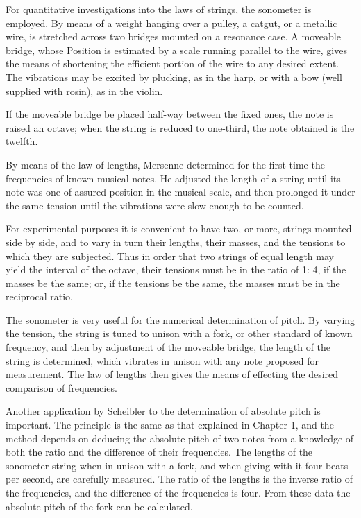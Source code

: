 For quantitative investigations into the laws of strings, the sonometer is
employed. By means of a weight hanging over a pulley, a catgut, or a metallic
wire, is stretched across two bridges mounted on a resonance case. A moveable
bridge, whose Position is estimated by a scale running parallel to the wire,
gives the means of shortening the efficient portion of the wire to any desired
extent. The vibrations may be excited by plucking, as in the harp, or with a
bow (well supplied with rosin), as in the violin.

If the moveable bridge be placed half-way between the fixed ones, the note is
raised an octave; when the string is reduced to one-third, the note obtained is
the twelfth.

By means of the law of lengths, Mersenne determined for the first time the
frequencies of known musical notes. He adjusted the length of a string until
its note was one of assured position in the musical scale, and then prolonged
it under the same tension until the vibrations were slow enough to be counted.

For experimental purposes it is convenient to have two, or more, strings
mounted side by side, and to vary in turn their lengths, their masses, and the
tensions to which they are subjected. Thus in order that two strings of equal
length may yield the interval of the octave, their tensions must be in the
ratio of 1: 4, if the masses be the same; or, if the tensions be the same, the
masses must be in the reciprocal ratio.

The sonometer is very useful for the numerical determination of pitch.  By
varying the tension, the string is tuned to unison with a fork, or other
standard of known frequency, and then by adjustment of the moveable bridge, the
length of the string is determined, which vibrates in unison with any note
proposed for measurement. The law of lengths then gives the means of effecting
the desired comparison of frequencies.

Another application by Scheibler to the determination of absolute pitch is
important. The principle is the same as that explained in Chapter 1, and the
method depends on deducing the absolute pitch of two notes from a knowledge of
both the ratio and the difference of their frequencies.  The lengths of the
sonometer string when in unison with a fork, and when giving with it four beats
per second, are carefully measured. The ratio of the lengths is the inverse
ratio of the frequencies, and the difference of the frequencies is four. From
these data the absolute pitch of the fork can be calculated.


